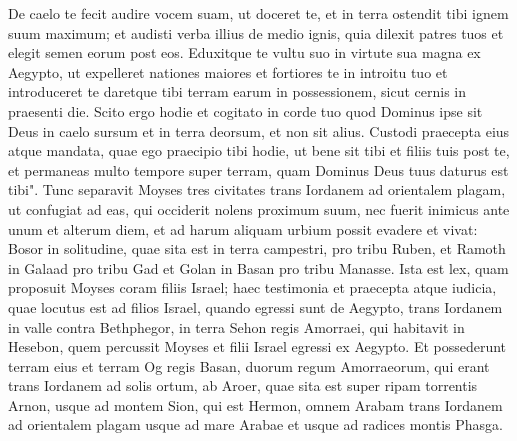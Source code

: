 \begin{biblechapter}
\verse De caelo te fecit audire vocem suam, ut doceret te, et in terra ostendit tibi ignem suum maximum; et audisti verba illius de medio ignis, 
\verse quia dilexit patres tuos et elegit semen eorum post eos. Eduxitque te vultu suo in virtute sua magna ex Aegypto, 
\verse ut expelleret nationes maiores et fortiores te in introitu tuo et introduceret te daretque tibi terram earum in possessionem, sicut cernis in praesenti die. 
\verse Scito ergo hodie et cogitato in corde tuo quod Dominus ipse sit Deus in caelo sursum et in terra deorsum, et non sit alius. 
\verse Custodi praecepta eius atque mandata, quae ego praecipio tibi hodie, ut bene sit tibi et filiis tuis post te, et permaneas multo tempore super terram, quam Dominus Deus tuus daturus est tibi". 
\verse Tunc separavit Moyses tres civitates trans Iordanem ad orientalem plagam,  
\verse ut confugiat ad eas, qui occiderit nolens proximum suum, nec fuerit inimicus ante unum et alterum diem, et ad harum aliquam urbium possit evadere et vivat: 
\verse Bosor in solitudine, quae sita est in terra campestri, pro tribu Ruben, et Ramoth in Galaad pro tribu Gad et Golan in Basan pro tribu Manasse. 
\verse Ista est lex, quam proposuit Moyses coram filiis Israel; 
\verse haec testimonia et praecepta atque iudicia, quae locutus est ad filios Israel, quando egressi sunt de Aegypto, 
\verse trans Iordanem in valle contra Bethphegor, in terra Sehon regis Amorraei, qui habitavit in Hesebon, quem percussit Moyses et filii Israel egressi ex Aegypto. 
\verse Et possederunt terram eius et terram Og regis Basan, duorum regum Amorraeorum, qui erant trans Iordanem ad solis ortum,  
\verse ab Aroer, quae sita est super ripam torrentis Arnon, usque ad montem Sion, qui est Hermon, 
\verse omnem Arabam trans Iordanem ad orientalem plagam usque ad mare Arabae et usque ad radices montis Phasga. 
\end{biblechapter}

